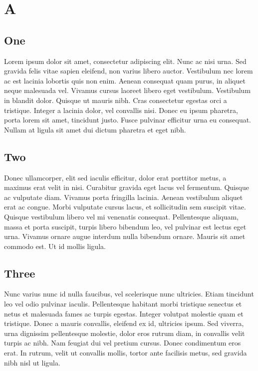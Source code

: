 \chapter{A}

\section{One}
Lorem ipsum dolor sit amet, consectetur adipiscing elit. Nunc ac nisi urna. Sed gravida felis vitae sapien eleifend, non varius libero auctor. Vestibulum nec lorem ac est lacinia lobortis quis non enim. Aenean consequat quam purus, in aliquet neque malesuada vel. Vivamus cursus laoreet libero eget vestibulum. Vestibulum in blandit dolor. Quisque ut mauris nibh. Cras consectetur egestas orci a tristique. Integer a lacinia dolor, vel convallis nisi. Donec eu ipsum pharetra, porta lorem sit amet, tincidunt justo. Fusce pulvinar efficitur urna eu consequat. Nullam at ligula sit amet dui dictum pharetra et eget nibh.

\section{Two}
Donec ullamcorper, elit sed iaculis efficitur, dolor erat porttitor metus, a maximus erat velit in nisi. Curabitur gravida eget lacus vel fermentum. Quisque ac vulputate diam. Vivamus porta fringilla lacinia. Aenean vestibulum aliquet erat ac congue. Morbi vulputate cursus lacus, et sollicitudin sem suscipit vitae. Quisque vestibulum libero vel mi venenatis consequat. Pellentesque aliquam, massa et porta suscipit, turpis libero bibendum leo, vel pulvinar est lectus eget urna. Vivamus ornare augue interdum nulla bibendum ornare. Mauris sit amet commodo est. Ut id mollis ligula.

\section{Three}
Nunc varius nunc id nulla faucibus, vel scelerisque nunc ultricies. Etiam tincidunt leo vel odio pulvinar iaculis. Pellentesque habitant morbi tristique senectus et netus et malesuada fames ac turpis egestas. Integer volutpat molestie quam et tristique. Donec a mauris convallis, eleifend ex id, ultricies ipsum. Sed viverra, urna dignissim pellentesque molestie, dolor eros rutrum diam, in convallis velit turpis ac nibh. Nam feugiat dui vel pretium cursus. Donec condimentum eros erat. In rutrum, velit ut convallis mollis, tortor ante facilisis metus, sed gravida nibh nisl ut ligula.

